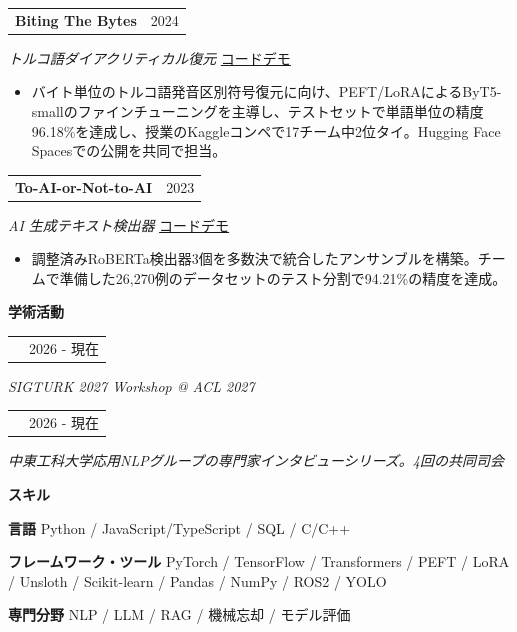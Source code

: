 \documentclass[11pt,a4paper]{article}
\makeatletter
\newcommand{\cvlink}[2]{\href{#1}{\textcolor{linkblue}{#2}}}
\newcommand{\cvul}{\bgroup\markoverwith{\textcolor{muted!45}{\rule[-0.45ex]{2pt}{0.35pt}}}\ULon}
\newcommand{\hlink}[2]{\href{#1}{\cvul{#2}}}
\newcommand{\cvsep}{\enspace\textperiodcentered\enspace{}}
\newcommand{\cvsection}[3][5]{%
  \par\Needspace*{#1\baselineskip}\vspace{6pt}%
  {\bfseries\fontsize{11}{13}\selectfont #3}\par\nobreak
  \vspace{3pt}{\color{muted}\hrule height 0.4pt}\nobreak\vspace{6pt}%
}
\newcommand{\cvheading}[2]{%
  \begin{tabularx}{\linewidth}{@{}>{\raggedright\arraybackslash}X@{\hspace{10pt}}r@{}}%
  \textbf{#1} & {\small\color{muted}#2}\\
  \end{tabularx}\par\nobreak
}
\newenvironment{cvpoints}{\begin{itemize}[leftmargin=12pt,itemsep=2pt,topsep=2pt,parsep=0pt]\small}{\end{itemize}}
\makeatother
\begin{document}
\begin{minipage}{\linewidth}\raggedright
\cvheading{Biting The Bytes}{2024}
{\small{}\itshape{}\color{muted}トルコ語ダイアクリティカル復元}\hfill{\small{}%
\mbox{\cvlink{https://github.com/rusen-archive/Biting-The-Bytes}{コード}}\cvsep\mbox{\cvlink{https://huggingface.co/spaces/rusen/diacritize-tr}{デモ}}%
}\par\vspace{2pt}
\begin{cvpoints}
\item バイト単位のトルコ語発音区別符号復元に向け、PEFT/LoRAによるByT5-smallのファインチューニングを主導し、テストセットで単語単位の精度96.18\%を達成し、授業のKaggleコンペで17チーム中2位タイ。Hugging Face Spacesでの公開を共同で担当。
\end{cvpoints}
\end{minipage}\par\vspace{5pt}
\begin{minipage}{\linewidth}\raggedright
\cvheading{To-AI-or-Not-to-AI}{2023}
{\small{}\itshape{}\color{muted}AI 生成テキスト検出器}\hfill{\small{}%
\mbox{\cvlink{https://github.com/rusen-archive/To-AI-or-Not-to-AI}{コード}}\cvsep\mbox{\cvlink{https://huggingface.co/spaces/rusen/gpt_detector}{デモ}}%
}\par\vspace{2pt}
\begin{cvpoints}
\item 調整済みRoBERTa検出器3個を多数決で統合したアンサンブルを構築。チームで準備した26,270例のデータセットのテスト分割で94.21\%の精度を達成。
\end{cvpoints}
\end{minipage}\par\vspace{5pt}


\cvsection{}{学術活動}
\cvheading{\small{}\hlink{https://sigturk.github.io/workshops/2027/shared-task/}{SIGTURK 2027 Shared Task 共同主催者}}{2026 - 現在}
{\small{}\itshape{}\color{muted}SIGTURK 2027 Workshop @ ACL 2027}\par\vspace{4pt}
\cvheading{\small{}\hlink{https://www.youtube.com/@metunlpconnect}{METU NLP Connect 運営責任者}}{2026 - 現在}
{\small{}\itshape{}\color{muted}中東工科大学応用NLPグループの専門家インタビューシリーズ。4回の共同司会}\par\vspace{4pt}


\cvsection{}{スキル}
{\small{}\textbf{言語}\enspace{} Python / JavaScript/TypeScript / SQL / C/C++}\par\vspace{4pt}
{\small{}\textbf{フレームワーク・ツール}\enspace{} PyTorch / TensorFlow / Transformers / PEFT / LoRA / Unsloth / Scikit-learn / Pandas / NumPy / ROS2 / YOLO}\par\vspace{4pt}
{\small{}\textbf{専門分野}\enspace{} NLP / LLM / RAG / 機械忘却 / モデル評価}\par\vspace{4pt}
\end{document}
